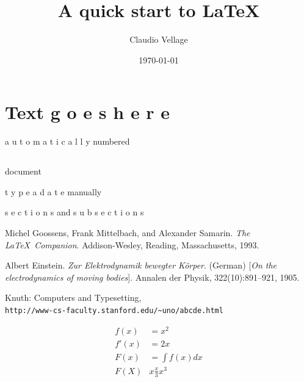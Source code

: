 \documentclass{article}
\begin{document}
\section{Text g o e s h e r e } %
a u t o m a t i c a l l y numbered
\subsection{}
\subsubsection{}
\paragraph {} %
\subparagraph {}
\author{ Claudio Vellage } %
\title{A quick start to \LaTeX{}} %
document
\date{\today{}} %
t y p e a d a t e manually
\maketitle{} %
\tableofcontents {} %
s e c t i o n s and s u b s e c t i o n s
\\ %
\newpage{} %

\begin{thebibliography}{9}
Michel Goossens, Frank Mittelbach, and Alexander Samarin. 
\textit{The \LaTeX\ Companion}. 
Addison-Wesley, Reading, Massachusetts, 1993.
 
Albert Einstein. 
\textit{Zur Elektrodynamik bewegter K{\"o}rper}. (German) 
[\textit{On the electrodynamics of moving bodies}]. 
Annalen der Physik, 322(10):891–921, 1905.
 
Knuth: Computers and Typesetting,
\\\texttt{http://www-cs-faculty.stanford.edu/\~{}uno/abcde.html}
\end{thebibliography}

\begin{align}
f(x) &= x^2\\
f'(x) &= 2x\\
F(x) &= \int f(x)dx\\
F(X) &x \frac{x}{3}x^3
\end{align}
\end{document}
